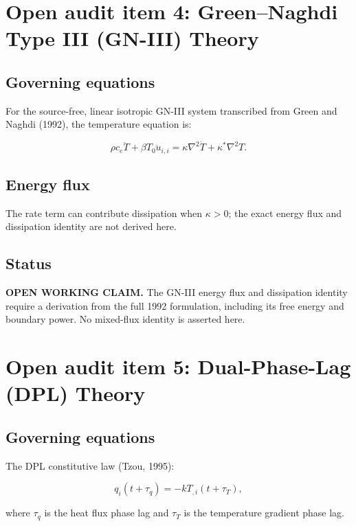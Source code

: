 \section{Open audit item 4: Green--Naghdi Type III (GN-III) Theory}

\subsection{Governing equations}

For the source-free, linear isotropic GN-III system transcribed from Green and Naghdi (1992), the temperature equation is:

\begin{equation}
\rho c_e\ddot{T} + \beta T_0\ddot{u}_{i,i} = \kappa\nabla^2\dot{T} + \kappa^*\nabla^2T.
\label{ef:gn3:1}
\end{equation}

\subsection{Energy flux}

The rate term can contribute dissipation when $\kappa>0$; the exact energy flux and dissipation identity are not derived here.

\subsection{Status}

\textbf{OPEN WORKING CLAIM.} The GN-III energy flux and dissipation identity require a derivation from the full 1992 formulation, including its free energy and boundary power. No mixed-flux identity is asserted here.

\section{Open audit item 5: Dual-Phase-Lag (DPL) Theory}

\subsection{Governing equations}

The DPL constitutive law (Tzou, 1995):

\begin{equation}
q_i(t + \tau_q) = -k T_{,i}(t + \tau_T),
\label{ef:dpl:1}
\end{equation}

where $\tau_q$ is the heat flux phase lag and $\tau_T$ is the temperature gradient phase lag.

